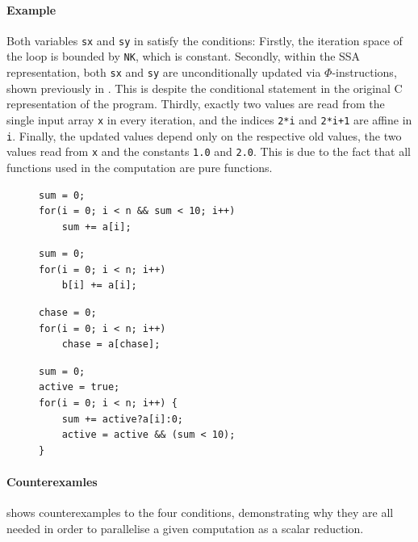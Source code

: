     \paragraph*{Example}
    Both variables \texttt{sx} and \texttt{sy} in
     satisfy the conditions:
    Firstly, the iteration space of the loop is bounded by \texttt{NK}, which is
    constant.
    Secondly, within the SSA representation, both \texttt{sx} and \texttt{sy}
    are unconditionally updated via $\Phi$-instructions, shown previously in
    .
    This is despite the conditional statement in the original C representation
    of the program.
    Thirdly, exactly two values are read from the single input array \texttt{x}
    in every iteration, and the indices \texttt{2*i} and \texttt{2*i+1} are
    affine in \texttt{i}.
    Finally, the updated values depend only on the respective old values,
    the two values read from \texttt{x} and the constants \texttt{1.0} and
    \texttt{2.0}.
    This is due to the fact that all functions used in the computation are pure
    functions.

\begin{figure}[t]
\begin{lstlisting}[language=MyCpp]
sum = 0;
for(i = 0; i < n && sum < 10; i++)
    sum += a[i];
\end{lstlisting}
\begin{lstlisting}[language=MyCpp]
sum = 0;
for(i = 0; i < n; i++)
    b[i] += a[i];
\end{lstlisting}
\begin{lstlisting}[language=MyCpp]
chase = 0;
for(i = 0; i < n; i++)
    chase = a[chase];
\end{lstlisting}
\begin{lstlisting}[language=MyCpp,label={counterexamples},caption=
   {Counterexamples to the four conditions: None of these computations can be
    parallelised as scalar reductions.
    The first and last example implement the same program.\parfillskip=0pt}]
sum = 0;
active = true;
for(i = 0; i < n; i++) {
    sum += active?a[i]:0;
    active = active && (sum < 10);
}
\end{lstlisting}
\end{figure}

    \paragraph*{Counterexamles}
     shows counterexamples to the four conditions,
    demonstrating why they are all needed in order to parallelise a given
    computation as a scalar reduction.

